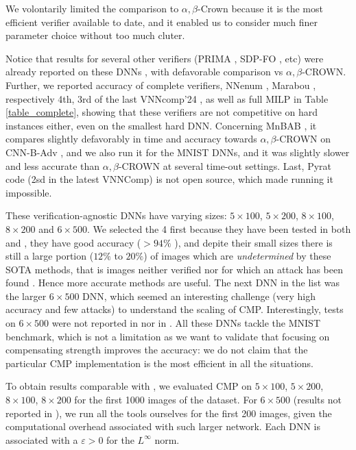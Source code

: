 We volontarily limited the comparison to $\alpha,\beta$-Crown because it is the most efficient verifier available to date, and it enabled us to consider much finer parameter choice without too much cluter. 

Notice that results for several other verifiers (PRIMA \cite{prima}, SDP-FO \cite{SDPFI}, etc) were already reported on these DNNs \cite{crown}, with defavorable comparison vs $\alpha,\beta$-CROWN. Further, we reported accuracy of complete verifiers, NNenum \cite{nnenum}, Marabou \cite{Marabou, Marabou2}, respectively 4th, 3rd 
of the last VNNcomp'24 \cite{VNNcomp24}, as well as full MILP \cite{MILP} in Table \ref{table_complete}, showing that these verifiers are not competitive on hard instances either, even on the smallest hard DNN. Concerning MnBAB \cite{ferrari2022complete}, it compares slightly defavorably in time and accuracy towards $\alpha,\beta$-CROWN on CNN-B-Adv \cite{ferrari2022complete}, and we also run it for the MNIST DNNs, and it was slightly slower and less accurate than $\alpha,\beta$-CROWN at several time-out settings. 
Last, Pyrat code (2sd in the latest VNNComp) is not open source, which made running it impossible.




\iffalse

These verification-agnostic DNNs have varying sizes: $5\times 100$, $5\times 200$, $8 \times 100$, $8 \times 200$ and $6 \times 500$. We selected the 4 first because they have been tested in both \cite{prima} and \cite{crown}, they have good accuracy ($>94\%$ \cite{prima}), 
and depite their small sizes there is still a large portion ($12\%$ to $20\%$) of images which are {\em undetermined} by these SOTA methods, that is images neither verified nor for which an attack has been found  \cite{attack}. Hence more accurate methods are useful. 
The next DNN in the list was the larger $6 \times 500$ DNN, which seemed an interesting challenge (very high accuracy and few attacks) to understand the scaling of CMP. Interestingly, tests on $6 \times 500$ were not reported in \cite{prima} nor in \cite{crown}. All these DNNs tackle the MNIST benchmark, which is not a limitation as we want to validate that focusing on compensating strength improves the accuracy: we do not claim that the particular CMP implementation is the most efficient in all the situations.

To obtain results comparable with \cite{prima,crown}, 
we evaluated CMP on $5\times 100$, $5\times 200$, $8 \times 100$, $8 \times 200$ for the first 1000 images of the dataset. For $6\times 500$ (results not reported in \cite{prima,crown}), we run all the tools ourselves for the first 200 images, given the computational overhead associated with such larger network. Each DNN is associated with a $\varepsilon>0$ for the $L^\infty$ norm.

